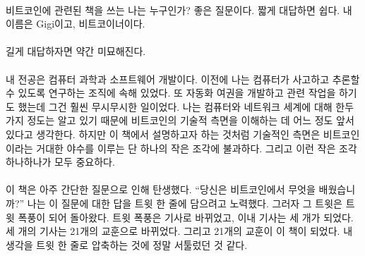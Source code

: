 \paragraph{}
비트코인에 관련된 책을 쓰는 나는 누구인가? 좋은 질문이다. 
짧게 대답하면 쉽다. 내 이름은 Gigi이고, 비트코이너이다.


\paragraph{}
길게 대답하자면 약간 미묘해진다.

\paragraph{}
내 전공은 컴퓨터 과학과 소프트웨어 개발이다. 
이전에 나는 컴퓨터가 사고하고 추론할 수 있도록 연구하는 조직에 속해 있었다. 
또 자동화 여권을 개발하고 관련 작업을 하기도 했는데 그건 훨씬 무시무시한 일이었다. 
나는 컴퓨터와 네트워크 세계에 대해 한두 가지 정도는 알고 있기 때문에 비트코인의 기술적 측면을 이해하는 데 어느 정도 앞서 있다고 생각한다.
하지만 이 책에서 설명하고자 하는 것처럼 기술적인 측면은 비트코인이라는 거대한 야수를 이루는 단 하나의 작은 조각에 불과하다. 
그리고 이런 작은 조각 하나하나가 모두 중요하다. 


\paragraph{}
이 책은 아주 간단한 질문으로 인해 탄생했다.  
\enquote{당신은 비트코인에서 무엇을 배웠습니까?}
나는 이 질문에 대한 답을 트윗 한 줄에 담으려고 노력했다.
그러자 그 트윗은 트윗 폭풍이 되어 돌아왔다. 트윗 폭풍은 기사로 바뀌었고, 이내 기사는 세 개가 되었다. 
세 개의 기사는 21개의 교훈으로 바뀌었다. 그리고 21개의 교훈이 이 책이 되었다. 내 생각을 트윗 한 줄로 압축하는 것에 정말 서툴렀던 것 같다.


